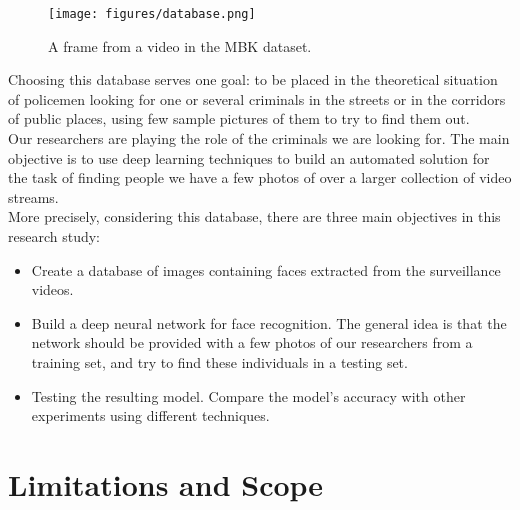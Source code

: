 \begin{figure}[t]
  \centering
  \texttt{[image: figures/database.png]}  
  \caption[A frame from a video in the MBK dataset.]{A frame from a video in the MBK dataset.}
  \label{fig:example}
\end{figure}

Choosing this database serves one goal: to be placed in the theoretical situation of policemen looking for one or several criminals in the streets or in the corridors of public places, using few sample pictures of them to try to find them out.\\

Our researchers are playing the role of the criminals we are looking for.
The main objective is to use deep learning techniques to build an automated solution for the task of finding people we have a few photos of over a larger collection of video streams.\\

More precisely, considering this database, there are three main objectives in this research study:
\begin{itemize}
\item Create a database of images containing faces extracted from the surveillance videos.
\item Build a deep neural network for face recognition. The general idea is that the network should be provided with a few photos of our researchers from a training set, and try to find these individuals in a testing set.
\item Testing the resulting model. Compare the model's accuracy with other experiments using different techniques.
\end{itemize}

\section{Limitations and Scope}

